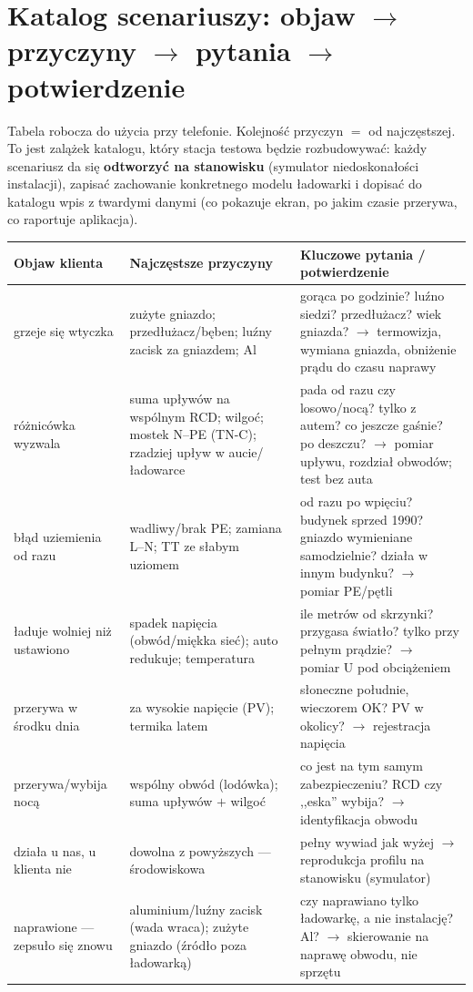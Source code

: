 \documentclass[11pt,a4paper]{article}
\begin{document}
\section{Katalog scenariuszy: objaw $\to$ przyczyny $\to$ pytania $\to$ potwierdzenie}
\label{sec:katalog}
Tabela robocza do użycia przy telefonie. Kolejność przyczyn $=$ od najczęstszej. To jest zalążek
katalogu, który stacja testowa będzie rozbudowywać: każdy scenariusz da się \textbf{odtworzyć na
stanowisku} (symulator niedoskonałości instalacji), zapisać zachowanie konkretnego modelu ładowarki
i dopisać do katalogu wpis z twardymi danymi (co pokazuje ekran, po jakim czasie przerywa, co
raportuje aplikacja).

\begin{longtable}{@{}p{}p{}p{}@{}}
\toprule
\textbf{Objaw klienta} & \textbf{Najczęstsze przyczyny} & \textbf{Kluczowe pytania / potwierdzenie}\\
\midrule
grzeje się wtyczka & zużyte gniazdo; przedłużacz/bęben; luźny zacisk za gniazdem; Al & gorąca po
godzinie? luźno siedzi? przedłużacz? wiek gniazda? $\to$ termowizja, wymiana gniazda, obniżenie
prądu do czasu naprawy\\
różnicówka wyzwala & suma upływów na wspólnym RCD; wilgoć; mostek N--PE (TN-C); rzadziej upływ
w aucie/ładowarce & pada od razu czy losowo/nocą? tylko z autem? co jeszcze gaśnie? po deszczu?
$\to$ pomiar upływu, rozdział obwodów; test bez auta\\
błąd uziemienia od razu & wadliwy/brak PE; zamiana L--N; TT ze słabym uziomem & od razu po wpięciu?
budynek sprzed 1990? gniazdo wymieniane samodzielnie? działa w innym budynku? $\to$ pomiar PE/pętli\\
ładuje wolniej niż ustawiono & spadek napięcia (obwód/miękka sieć); auto redukuje; temperatura & ile
metrów od skrzynki? przygasa światło? tylko przy pełnym prądzie? $\to$ pomiar U pod obciążeniem\\
przerywa w środku dnia & za wysokie napięcie (PV); termika latem & słoneczne południe, wieczorem OK?
PV w okolicy? $\to$ rejestracja napięcia\\
przerywa/wybija nocą & wspólny obwód (lodówka); suma upływów $+$ wilgoć & co jest na tym samym
zabezpieczeniu? RCD czy ,,eska'' wybija? $\to$ identyfikacja obwodu\\
działa u nas, u klienta nie & dowolna z powyższych --- środowiskowa & pełny wywiad jak wyżej $\to$
reprodukcja profilu na stanowisku (symulator)\\
naprawione --- zepsuło się znowu & aluminium/luźny zacisk (wada wraca); zużyte gniazdo (źródło poza
ładowarką) & czy naprawiano tylko ładowarkę, a nie instalację? Al? $\to$ skierowanie na naprawę
obwodu, nie sprzętu\\
\bottomrule
\end{longtable}
\end{document}
